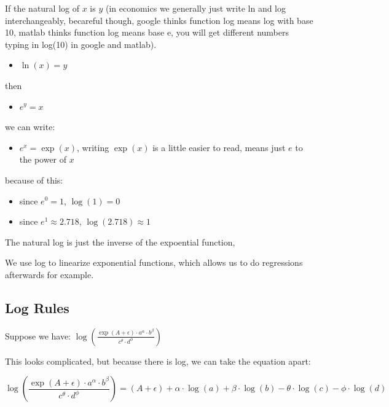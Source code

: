 \documentclass[
]{book}
\providecommand{\tightlist}{%
  \setlength{\itemsep}{0pt}\setlength{\parskip}{0pt}}
\begin{document}
If the natural log of \(x\) is \(y\) (in economics we generally just write
ln and log interchangeably, becareful though, google thinks function log
means log with base 10, matlab thinks function log means base e, you
will get different numbers typing in log(10) in google and matlab).

\begin{itemize}
\tightlist
\item
  \(\displaystyle \ln (x)=y\)
\end{itemize}

then

\begin{itemize}
\tightlist
\item
  \(\displaystyle e^y =x\)
\end{itemize}

we can write:

\begin{itemize}
\tightlist
\item
  \(e^x =\exp (x)\), writing \(\exp (x)\) is a little easier to read,
  means just \(e\) to the power of \(x\)
\end{itemize}

because of this:

\begin{itemize}
\item
  since \(e^0 =1\), \(\log (1)=0\)
\item
  since \(e^1 \approx 2.718\), \(\log (2.718)\approx 1\)
\end{itemize}

The natural log is just the inverse of the expoential function,

We use log to linearize exponential functions, which allows us to do
regressions afterwards for example.

\hypertarget{log-rules}{%
\subsection{Log Rules}\label{log-rules}}

Suppose we have:
\(\log \left(\frac{\exp (A+\epsilon )\cdot a^{\alpha } \cdot b^{\beta } }{c^{\theta } \cdot d^{\phi } }\right)\)

This looks complicated, but because there is log, we can take the
equation apart:

\[\log \left(\frac{\exp (A+\epsilon )\cdot a^{\alpha } \cdot b^{\beta } }{c^{\theta } \cdot d^{\phi } }\right)=(A+\epsilon )+\alpha \cdot \log (a)+\beta \cdot \log (b)-\theta \cdot \log (c)-\phi \cdot \log (d)\]
\end{document}
